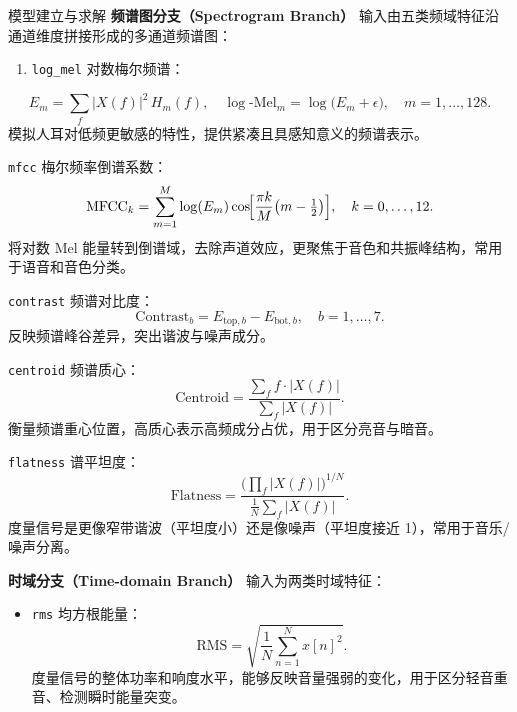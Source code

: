 \documentclass[aspectratio=169]{beamer}
\begin{document}
\begin{frame}{模型建立与求解}
\textbf{频谱图分支（Spectrogram Branch）}  
    输入由五类频域特征沿通道维度拼接形成的多通道频谱图：
    \begin{enumerate}
        \item \texttt{log\_mel} 对数梅尔频谱：
    \end{enumerate}
        \begin{equation}
            E_m = \sum_{f} |X(f)|^2\, H_m(f), \quad
            \log\text{-Mel}_m = \log\bigl(E_m + \epsilon\bigr),\quad m=1,\dots,128.
        \end{equation}
        模拟人耳对低频更敏感的特性，提供紧凑且具感知意义的频谱表示。
        
    \texttt{mfcc} 梅尔频率倒谱系数：
        \begin{equation}
            \mathrm{MFCC}_k = \sum_{m=1}^{M} \log(E_m)\cos\!\Bigl[\frac{\pi k}{M}\bigl(m - \tfrac{1}{2}\bigr)\Bigr],\quad k=0,\dots,12.
        \end{equation}
        将对数 Mel 能量转到倒谱域，去除声道效应，更聚焦于音色和共振峰结构，常用于语音和音色分类。
        
    \texttt{contrast} 频谱对比度：
        \begin{equation}
            \mathrm{Contrast}_b = E_{\mathrm{top},b} - E_{\mathrm{bot},b},\quad b=1,\dots,7.
        \end{equation}
        反映频谱峰谷差异，突出谐波与噪声成分。
        
    \texttt{centroid} 频谱质心：
        \begin{equation}
            \mathrm{Centroid} = \frac{\sum_f f\cdot |X(f)|}{\sum_f |X(f)|}.
        \end{equation}
        衡量频谱重心位置，高质心表示高频成分占优，用于区分亮音与暗音。
        
    \texttt{flatness} 谱平坦度：
        \begin{equation}
            \mathrm{Flatness} = \frac{\bigl(\prod_f |X(f)|\bigr)^{1/N}}{\frac{1}{N}\sum_f |X(f)|}.
        \end{equation}
        度量信号是更像窄带谐波（平坦度小）还是像噪声（平坦度接近 1），常用于音乐/噪声分离。
    
\textbf{时域分支（Time-domain Branch）}  
    输入为两类时域特征：
    \begin{itemize}
        \item \texttt{rms} 均方根能量：
        \begin{equation}
            \mathrm{RMS} = \sqrt{\frac{1}{N}\sum_{n=1}^N x[n]^2}.
        \end{equation}
        度量信号的整体功率和响度水平，能够反映音量强弱的变化，用于区分轻音重音、检测瞬时能量突变。
        

\end{itemize}
\end{frame}
\end{document}
